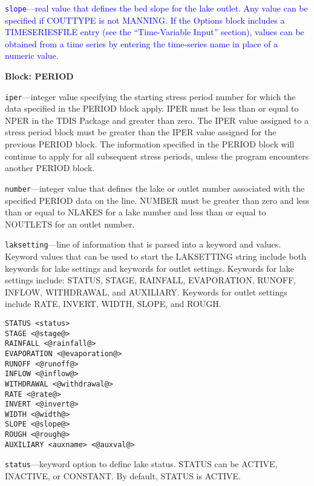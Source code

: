 \begin{description}
\item \textcolor{blue}{\texttt{slope}---real value that defines the bed slope for the lake outlet. Any value can be specified if COUTTYPE is not MANNING. If the Options block includes a TIMESERIESFILE entry (see the ``Time-Variable Input'' section), values can be obtained from a time series by entering the time-series name in place of a numeric value.}

\end{description}
\item \textbf{Block: PERIOD}

\begin{description}
\item \texttt{iper}---integer value specifying the starting stress period number for which the data specified in the PERIOD block apply.  IPER must be less than or equal to NPER in the TDIS Package and greater than zero.  The IPER value assigned to a stress period block must be greater than the IPER value assigned for the previous PERIOD block.  The information specified in the PERIOD block will continue to apply for all subsequent stress periods, unless the program encounters another PERIOD block.

\item \texttt{number}---integer value that defines the lake or outlet number associated with the specified PERIOD data on the line.  NUMBER must be greater than zero and less than or equal to NLAKES for a lake number and less than or equal to NOUTLETS for an outlet number.

\item \texttt{laksetting}---line of information that is parsed into a keyword and values.  Keyword values that can be used to start the LAKSETTING string include both keywords for lake settings and keywords for outlet settings.  Keywords for lake settings include: STATUS, STAGE, RAINFALL, EVAPORATION, RUNOFF, INFLOW, WITHDRAWAL, and AUXILIARY.  Keywords for outlet settings include RATE, INVERT, WIDTH, SLOPE, and ROUGH.

\begin{lstlisting}[style=blockdefinition]
STATUS <status>
STAGE <@stage@>
RAINFALL <@rainfall@>
EVAPORATION <@evaporation@>
RUNOFF <@runoff@>
INFLOW <@inflow@>
WITHDRAWAL <@withdrawal@>
RATE <@rate@>
INVERT <@invert@>
WIDTH <@width@>
SLOPE <@slope@>
ROUGH <@rough@>
AUXILIARY <auxname> <@auxval@> 
\end{lstlisting}

\item \texttt{status}---keyword option to define lake status.  STATUS can be ACTIVE, INACTIVE, or CONSTANT. By default, STATUS is ACTIVE.


\end{description}
